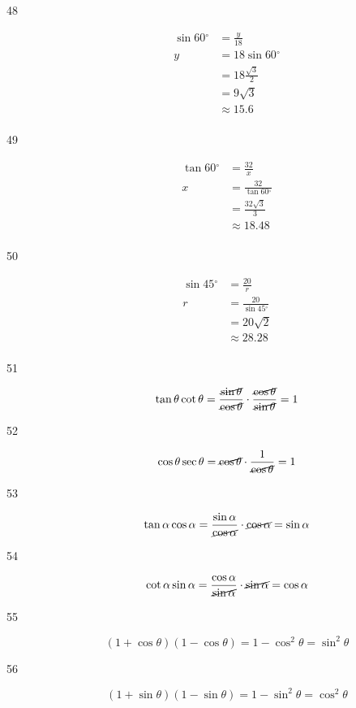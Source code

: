 \documentclass[fleqn,addpoints]{exam}
\newcommand{\degree}{\ensuremath{^\circ}}
\begin{document}
\begin{description}
\item[48]
\begin{align*}
  \sin 60 \degree &= \frac{y}{18} \\
  y &= 18 \sin 60 \degree \\
   &= 18 \frac{\sqrt{3}}{2} \\
   &= 9 \sqrt{3} \\
   &\approx 15.6 \\
\end{align*}

\item[49]
\begin{align*}
  \tan 60 \degree &= \frac{32}{x} \\
  x &= \frac{32}{\tan 60 \degree} \\
   &= \frac{32 \sqrt{3}}{3} \\
   & \approx 18.48 \\
\end{align*}

\item[50]
\begin{align*}
  \sin 45 \degree &= \frac{20}{r} \\
  r &= \frac{20}{\sin 45 \degree} \\
   &= 20 \sqrt{2} \\
   & \approx 28.28 \\
\end{align*}

\item[51]
\[
  \tan \theta \cot \theta 
  = \frac{\cancel{\sin \theta}}{\cancel{\cos \theta}} \cdot \frac{\cancel{\cos \theta}}{\cancel{\sin \theta}} = 1 
\]

\item[52]
\[
  \cos \theta \sec \theta = \cancel{\cos \theta} \cdot \frac{1}{\cancel{\cos \theta}} = 1
\]

\item[53]
\[
  \tan \alpha \cos \alpha = \frac{\sin \alpha}{\cancel{\cos \alpha}} \cdot \cancel{\cos \alpha} = \sin \alpha
\]

\item[54]
\[
  \cot \alpha \sin \alpha = \frac{\cos \alpha}{\cancel{\sin \alpha}} \cdot \cancel{\sin \alpha} = \cos \alpha
\]

\item[55]
\[
  (1 + \cos \theta)(1 - \cos \theta) = 1 - \cos^2 \theta = \sin^2 \theta
\]

\item[56]
\[
  (1 + \sin \theta)(1 - \sin \theta) = 1 - \sin^2 \theta = \cos^2 \theta
\]


\end{description}
\end{document}
